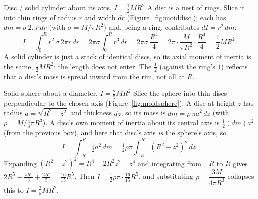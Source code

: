 \begin{derivbox}{Disc / solid cylinder about its axis, $I=\tfrac{1}{2} MR^2$}
A disc is a nest of rings. Slice it into thin rings of radius $r$ and width $dr$ (Figure~\ref{fig:moiddisc}); each has
$dm=\sigma\,2\pi r\,dr$ (with $\sigma=M/\pi R^2$) and, being a ring, contributes $dI=r^2\,dm$:
\[
I=\int_0^R r^2\,\sigma\,2\pi r\,dr=2\pi\sigma\int_0^R r^3\,dr=2\pi\sigma\,\frac{R^4}{4}
=2\pi\cdot\frac{M}{\pi R^2}\cdot\frac{R^4}{4}=\frac{1}{2}MR^2.
\]
A solid cylinder is just a stack of identical discs, so its axial moment of inertia is the same,
$\tfrac{1}{2} MR^2$: the length does not enter. The $\tfrac{1}{2}$ (against the ring's $1$) reflects that a
disc's mass is spread inward from the rim, not all at $R$.
\end{derivbox}

\begin{figure}[htbp]
\centering
{}
\end{figure}

\begin{derivbox}{Solid sphere about a diameter, $I=\tfrac{2}{5} MR^2$}
Slice the sphere into thin discs perpendicular to the chosen axis (Figure~\ref{fig:moidsphere}). A disc at height $z$ has radius
$a=\sqrt{R^2-z^2}$ and thickness $dz$, so its mass is $dm=\rho\,\pi a^2\,dz$ (with
$\rho=M/\tfrac{4}{3}\pi R^3$). A disc's own moment of inertia about its central axis is $\tfrac{1}{2}(dm)a^2$
(from the previous box), and here that disc's axis \emph{is} the sphere's axis, so
\[
I=\int_{-R}^{R}\tfrac{1}{2} a^2\,dm=\tfrac{1}{2}\rho\pi\int_{-R}^{R}(R^2-z^2)^2\,dz.
\]
Expanding $(R^2-z^2)^2=R^4-2R^2z^2+z^4$ and integrating from $-R$ to $R$ gives
$2R^5-\tfrac{4R^5}{3}+\tfrac{2R^5}{5}=\tfrac{16}{15}R^5$. Then
$I=\tfrac{1}{2}\rho\pi\cdot\tfrac{16}{15}R^5$, and substituting $\rho=\dfrac{3M}{4\pi R^3}$ collapses this to
$\boxed{I=\tfrac{2}{5} MR^2}$.
\end{derivbox}

\begin{figure}[htbp]
\centering
{}
\end{figure}

